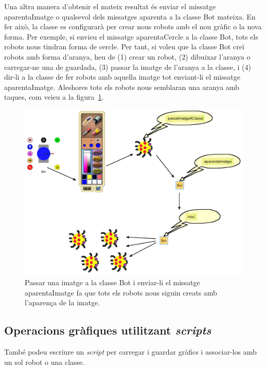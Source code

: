 Una  altra manera d'obtenir el mateix resultat és enviar el missatge \textsf{aparentaImatge} o qualsevol dels missatges \textsf{aparenta} a la classe \textsf{Bot} mateixa. En fer això, la classe es configurarà per crear nous robots amb el nou gràfic o la nova forma. Per exemple, si envieu el missatge \textsf{aparentaCercle}
a la classe \textsf{Bot}, tots els robots nous tindran forma de cercle. Per tant, si voleu que la classe \textsf{Bot} creï robots amb forma d'aranya, heu de (1) crear un robot, (2) dibuixar l'aranya o carregar-ne una de guardada, (3) passar la imatge de l'aranya a la classe, i (4) dir-li a la classe de fer robots amb aquella imatge tot enviant-li el missatge \textsf{aparentaImatge}. Aleshores tots els robots nous semblaran una aranya amb taques, com veieu a la figura~\ref{fig0610}.
\begin{figure}[h]
\begin{center}
\includegraphics[scale=0.475]{Imatges/figura6-10.pdf} 
\end{center}
\caption{Passar una imatge a la classe \textsf{\upshape Bot} i enviar-li el missatge \textsf{\upshape aparentaImatge} fa que tots els robots nous siguin creats amb l'aparença de la imatge.}
\label{fig0610}
\end{figure}

\subsection{Operacions gràfiques utilitzant \emph{scripts}}
També podeu escriure un \emph{script} per carregar i guardar gràfics i associar-los amb un sol robot o una classe.

